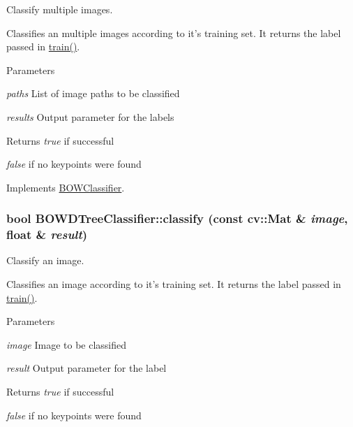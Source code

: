 Classify multiple images. 

Classifies an multiple images according to it's training set. It returns the label passed in \hyperlink{classBOWDTreeClassifier_a9bcdcb5fa8bb35d5d4a518b7a060c127}{train()}.


\begin{DoxyParams}{Parameters}
\item[{\em paths}]List of image paths to be classified \item[{\em results}]Output parameter for the labels \end{DoxyParams}
\begin{DoxyReturn}{Returns}
{\itshape true\/} if successful\par
 {\itshape false\/} if no keypoints were found 
\end{DoxyReturn}


Implements \hyperlink{classBOWClassifier_a0785d39115372051816210d8d2c0335e}{BOWClassifier}.

\hypertarget{classBOWDTreeClassifier_acbdf32fc2b2463f099efdf4000f3e2c1}{
\subsubsection[{classify}]{\setlength{\rightskip}{0pt plus 5cm}bool BOWDTreeClassifier::classify (const cv::Mat \& {\em image}, \/  float \& {\em result})}}
\label{classBOWDTreeClassifier_acbdf32fc2b2463f099efdf4000f3e2c1}


Classify an image. 

Classifies an image according to it's training set. It returns the label passed in \hyperlink{classBOWDTreeClassifier_a9bcdcb5fa8bb35d5d4a518b7a060c127}{train()}.


\begin{DoxyParams}{Parameters}
\item[{\em image}]Image to be classified \item[{\em result}]Output parameter for the label \end{DoxyParams}
\begin{DoxyReturn}{Returns}
{\itshape true\/} if successful\par
 {\itshape false\/} if no keypoints were found 
\end{DoxyReturn}


